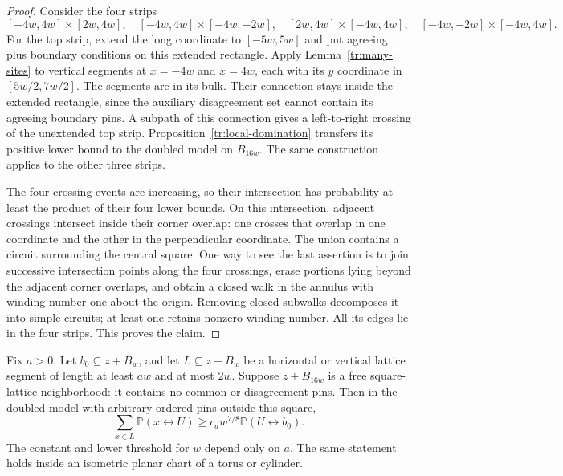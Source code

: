 \begin{proof}
Consider the four strips
\[
 [-4w,4w]\times[2w,4w],\quad
 [-4w,4w]\times[-4w,-2w],\quad
 [2w,4w]\times[-4w,4w],\quad
 [-4w,-2w]\times[-4w,4w].
\]
For the top strip, extend the long coordinate to $[-5w,5w]$ and put
agreeing plus boundary conditions on this extended rectangle. Apply
Lemma~\ref{tr:many-sites} to vertical segments at $x=-4w$ and $x=4w$,
each with its $y$ coordinate in $[5w/2,7w/2]$. The segments are in its
bulk. Their connection stays inside the extended rectangle, since the
auxiliary disagreement set cannot contain its agreeing boundary pins.
A subpath of this connection gives a left-to-right crossing of the
unextended top strip. Proposition~\ref{tr:local-domination} transfers
its positive lower bound to the doubled model on $B_{16w}$. The same
construction applies to the other three strips.

The four crossing events are increasing, so their intersection has
probability at least the product of their four lower bounds. On this
intersection, adjacent crossings intersect inside their corner overlap:
one crosses that overlap in one coordinate and the other in the
perpendicular coordinate. The union contains a circuit surrounding the
central square. One way to see the last assertion is to join successive
intersection points along the four crossings, erase portions lying beyond
the adjacent corner overlaps, and obtain a closed walk in the annulus
with winding number one about the origin. Removing closed subwalks
decomposes it into simple circuits; at least one retains nonzero winding
number. All its edges lie in the four strips. This proves the claim.
\end{proof}

\begin{proposition}
\label{tr:mass}
Fix $a>0$. Let $b_0\subseteq z+B_w$, and let $L\subseteq z+B_w$ be a
horizontal or vertical lattice segment of length at least $aw$ and at
most $2w$. Suppose $z+B_{16w}$ is a free square-lattice neighborhood:
it contains no common or disagreement pins. Then in the doubled model
with arbitrary ordered pins outside this square,
\begin{equation}
\label{tr:mass-eq}
 \sum_{x\in L}\mathbb P(x\longleftrightarrow U)
 \geq c_a w^{7/8}\mathbb P(U\longleftrightarrow b_0).
\end{equation}
The constant and lower threshold for $w$ depend only on $a$. The same
statement holds inside an isometric planar chart of a torus or cylinder.
\end{proposition}


